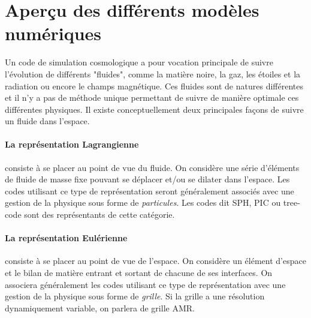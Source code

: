 \section{Aperçu des différents modèles numériques}
\label{sec:gridpart}
Un code de simulation cosmologique a pour vocation principale de suivre l'évolution de différents "fluides", comme la matière noire, la gaz, les étoiles et la radiation ou encore le champs magnétique.
Ces fluides sont de natures différentes et il n'y a pas de méthode unique permettant de suivre de manière optimale ces différentes physiques.
Il existe conceptuellement deux principales façons de suivre un fluide dans l'espace.

\paragraph{La représentation Lagrangienne} consiste à se placer au point de vue du fluide.
On considère une série d'éléments de fluide de masse fixe pouvant se déplacer et/ou se dilater dans l'espace.
Les codes utilisant ce type de représentation seront généralement associés avec une gestion de la physique sous forme de \emph{particules}.
Les codes dit \ac{SPH}, \ac{PIC} ou tree-code sont des représentants de cette catégorie.


\paragraph{La représentation Eulérienne} consiste à se placer au point de vue de l'espace.
On considère un élément d'espace et le bilan de matière entrant et sortant de chacune de ses interfaces.
On associera généralement les codes utilisant ce type de représentation avec une gestion de la physique sous forme de \emph{grille}.
Si la grille a une résolution dynamiquement variable, on parlera de grille \ac{AMR}.

